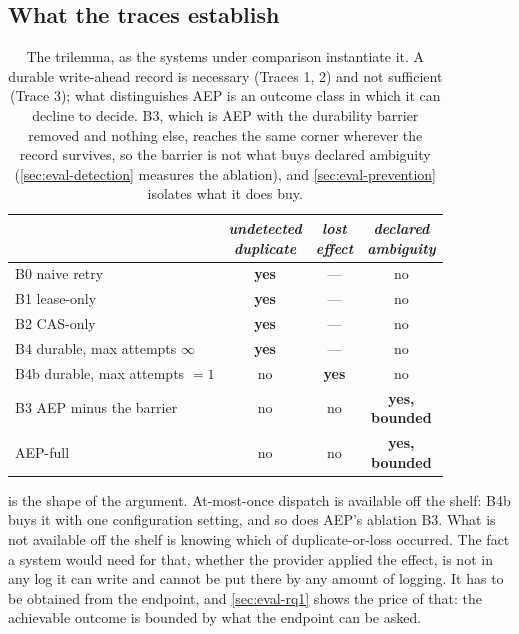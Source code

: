 \subsection{What the traces establish}

\begin{table}[t]
\centering
\caption{The trilemma, as the systems under comparison instantiate it. A
durable write-ahead record is necessary (Traces 1, 2) and not sufficient
(Trace 3); what distinguishes AEP is an outcome class in which it can decline
to decide. B3, which is AEP with the durability barrier removed and nothing
else, reaches the same corner wherever the record survives, so the barrier is
not what buys declared ambiguity (\cref{sec:eval-detection} measures the
ablation), and \cref{sec:eval-prevention} isolates what it does buy.}
\label{tab:trilemma}
\small
\renewcommand{\arraystretch}{1.08}
\begin{tabularx}{\columnwidth}{@{}>{\raggedright\arraybackslash}Xccc@{}}
\toprule
 & \shortstack{\emph{undetected}\\\emph{duplicate}}
 & \shortstack{\emph{lost}\\\emph{effect}}
 & \shortstack{\emph{declared}\\\emph{ambiguity}} \\
\midrule
B0 naive retry            & \textbf{yes} & --- & no \\
B1 lease-only             & \textbf{yes} & --- & no \\
B2 CAS-only               & \textbf{yes} & --- & no \\
B4 durable, max attempts $\infty$  & \textbf{yes} & --- & no \\
B4b durable, max attempts $=1$     & no & \textbf{yes} & no \\
\midrule
B3 AEP minus the barrier  & no & no & \shortstack{\textbf{yes,}\\\textbf{bounded}} \\
AEP-full                  & no & no & \shortstack{\textbf{yes,}\\\textbf{bounded}} \\
\bottomrule
\end{tabularx}
\end{table}

 is the shape of the argument. At-most-once dispatch is
available off the shelf: B4b buys it with one configuration setting, and so
does AEP's ablation B3. What is not available off the shelf is knowing which
of duplicate-or-loss occurred. The fact a system would need for that, whether
the provider applied the effect, is not in any log it can write and cannot be
put there by any amount of logging. It has to be obtained from the endpoint,
and \cref{sec:eval-rq1} shows the price of that: the achievable outcome is
bounded by what the endpoint can be asked.
